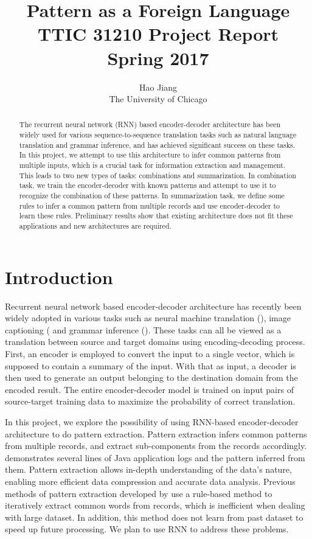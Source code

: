 \documentclass{article}
\title{\LARGE{Pattern as a Foreign Language} \\ \large{TTIC 31210 Project Report \\ Spring 2017}}
\author{Hao Jiang \\ The University of Chicago}
\begin{document}
\maketitle

\begin{abstract}
The recurrent neural network (RNN) based encoder-decoder architecture has been widely used for various sequence-to-sequence translation tasks such as natural language translation and grammar inference, and has achieved significant success on these tasks. In this project, we attempt to use this architecture to infer common patterns from multiple inputs, which is a crucial task for information extraction and management. This leads to two new types of tasks: combinations and summarization. In combination task, we train the encoder-decoder with known patterns and attempt to use it to recognize the combination of these patterns. In summarization task, we define some rules to infer a common pattern from multiple records and use encoder-decoder to learn these rules. Preliminary results show that existing architecture does not fit these applications and new architectures are required.
\end{abstract}

\section{Introduction}
Recurrent neural network based encoder-decoder architecture has recently been widely adopted in various tasks such as neural machine translation (\cite{ntran_2013, ntran_2014}), image captioning (\cite{icap_2015} and grammar inference (\cite{grammar_2014}). These tasks can all be viewed as a translation between source and target domains using encoding-decoding process. First, an encoder is employed to convert the input to a single vector, which is supposed to contain a summary of the input. With that as input, a decoder is then used to generate an output belonging to the destination domain from the encoded result. The entire encoder-decoder model is trained on input pairs of source-target training data to maximize the probability of correct translation.

In this project, we explore the possibility of using RNN-based encoder-decoder architecture to do pattern extraction. Pattern extraction infers common patterns from multiple records, and extract sub-components from the records accordingly.  demonstrates several lines of Java application logs and the pattern inferred from them. Pattern extraction allows in-depth understanding of the data's nature, enabling more efficient data compression and accurate data analysis. Previous methods of pattern extraction developed by \cite{dirt_2008} use a rule-based method to iteratively extract common words from records, which is inefficient when dealing with large dataset. In addition, this method does not learn from past dataset to speed up future processing. We plan to use RNN to address these problems.
\end{document}
